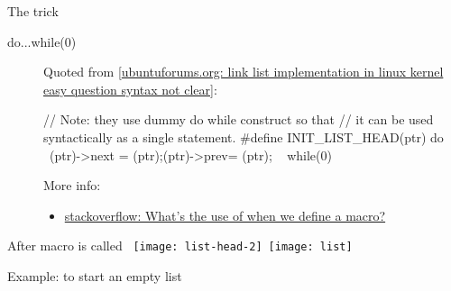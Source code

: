 \begin{frame}
  \begin{block}{The  trick}
    \begin{center}
       
    \end{center}
  \end{block}
\end{frame}

\begin{description}
\item[do...while(0)] Quoted from
  [\href{http://ubuntuforums.org/archive/index.php/t-1591281.html}{ubuntuforums.org: link
    list implementation in linux kernel easy question syntax not clear}]:
  \begin{center}
    \begin{ccode}
// Note: they use dummy do {} while construct so that
// it can be used syntactically as a single statement.
#define INIT_LIST_HEAD(ptr) do {           \
  (ptr)->next = (ptr);(ptr)->prev= (ptr);  \
} while(0)
    \end{ccode}
  \end{center}
  More info:
  \begin{itemize}
  \item
    \href{http://stackoverflow.com/questions/923822/whats-the-use-of-do-while0-when-we-define-a-macro}{stackoverflow:
      What's the use of  when we define a macro?}
  \end{itemize}
\end{description}

\begin{frame}
  \begin{block}{After  macro is called}
    \mbox{
      \texttt{[image: list-head-2]}\quad
      \texttt{[image: list]}
    }
  \end{block}
  Example: to start an empty  list
    \begin{center}
    \end{center}
\end{frame}

